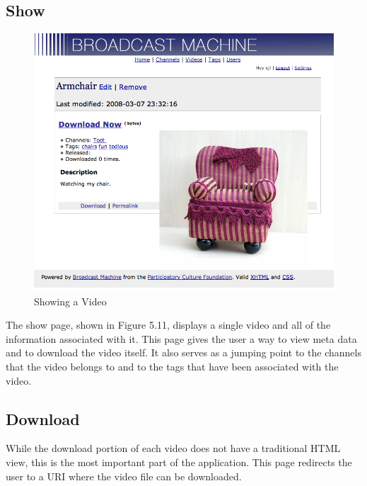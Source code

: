 \documentclass[a4paper,12pt]{report}
\begin{document}
\subsection{Show}
\begin{figure}[htp]
\begin{center}
\includegraphics[width=150mm]{./images/videoshow.png}
\end{center}
\caption{Showing a Video}
\end{figure}

The show page, shown in Figure 5.11, displays a single video and all of the information associated with it.
This page gives the user a way to view meta data and to download the video itself.
It also serves as a jumping point to the channels that the video belongs to and to the tags that have been associated with the video.

\subsection{Download}
While the download portion of each video does not have a traditional HTML view, this is the most important part of the application.
This page redirects the user to a URI where the video file can be downloaded.
\end{document}
